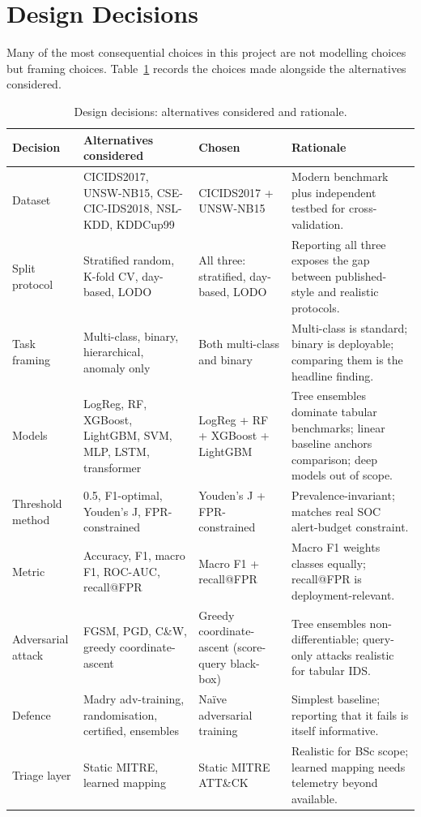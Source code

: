 \section{Design Decisions}
\label{sec:design}

Many of the most consequential choices in this project are not modelling
choices but framing choices. Table~\ref{tab:design-decisions} records the
choices made alongside the alternatives considered.

\begin{table}[H]
    \centering
    \caption{Design decisions: alternatives considered and rationale.}
    \label{tab:design-decisions}
    \footnotesize
    \begin{tabular}{p{2.6cm}p{4.0cm}p{2.6cm}p{4.4cm}}
        \toprule
        \textbf{Decision} & \textbf{Alternatives considered} & \textbf{Chosen} & \textbf{Rationale} \\
        \midrule
        Dataset & CICIDS2017, UNSW-NB15, CSE-CIC-IDS2018, NSL-KDD, KDDCup99 & CICIDS2017 + UNSW-NB15 & Modern benchmark plus independent testbed for cross-validation. \\
        \addlinespace
        Split protocol & Stratified random, K-fold CV, day-based, LODO & All three: stratified, day-based, LODO & Reporting all three exposes the gap between published-style and realistic protocols. \\
        \addlinespace
        Task framing & Multi-class, binary, hierarchical, anomaly only & Both multi-class and binary & Multi-class is standard; binary is deployable; comparing them is the headline finding. \\
        \addlinespace
        Models & LogReg, RF, XGBoost, LightGBM, SVM, MLP, LSTM, transformer & LogReg + RF + XGBoost + LightGBM & Tree ensembles dominate tabular benchmarks; linear baseline anchors comparison; deep models out of scope. \\
        \addlinespace
        Threshold method & 0.5, F1-optimal, Youden's J, FPR-constrained & Youden's J + FPR-constrained & Prevalence-invariant; matches real SOC alert-budget constraint. \\
        \addlinespace
        Metric & Accuracy, F1, macro F1, ROC-AUC, recall@FPR & Macro F1 + recall@FPR & Macro F1 weights classes equally; recall@FPR is deployment-relevant. \\
        \addlinespace
        Adversarial attack & FGSM, PGD, C\&W, greedy coordinate-ascent & Greedy coordinate-ascent (score-query black-box) & Tree ensembles non-differentiable; query-only attacks realistic for tabular IDS. \\
        \addlinespace
        Defence & Madry adv-training, randomisation, certified, ensembles & Naïve adversarial training & Simplest baseline; reporting that it fails is itself informative. \\
        \addlinespace
        Triage layer & Static MITRE, learned mapping & Static MITRE ATT\&CK & Realistic for BSc scope; learned mapping needs telemetry beyond available. \\
        \bottomrule
    \end{tabular}
\end{table}
